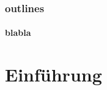 

\setlength\textheight{7cm} %
	\begin{frame}
		\maketitle
	\end{frame}
	\begin{frame}
		\frametitle{outlines}
		\framesubtitle{blabla}
		\tableofcontents
	\end{frame}
	

	\section{Einführung}
		


